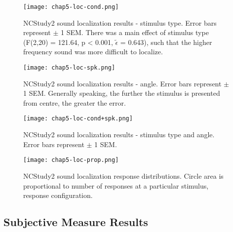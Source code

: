 \begin{figure}[htp]
\begin{center}
\texttt{[image: chap5-loc-cond.png]} \\
\caption[NCStudy2 sound localization results - stimulus type]{NCStudy2 sound localization results - stimulus type.  Error bars represent $\pm$ 1 SEM.  There was a main effect of stimulus type (F(2,20) = 121.64, p < 0.001, $\tilde{\epsilon}$ = 0.643), such that the higher frequency sound was more difficult to localize.}
\label{chap5-loc-cond}
\end{center}
\end{figure}

\begin{figure}[htp]
\begin{center}
\texttt{[image: chap5-loc-spk.png]} \\
\caption[NCStudy2 sound localization results - angle]{NCStudy2 sound localization results - angle.  Error bars represent $\pm$ 1 SEM.  Generally speaking, the further the stimulus is presented from centre, the greater the error.}
\label{chap5-loc-spk}
\end{center}
\end{figure}

\begin{figure}[htp]
\begin{center}
\texttt{[image: chap5-loc-cond+spk.png]} \\
\caption[NCStudy2 sound localization results - stimulus type and angle]{NCStudy2 sound localization results - stimulus type and angle.  Error bars represent $\pm$ 1 SEM.}
\label{chap5-loc-cond-spk}
\end{center}
\end{figure}

\begin{figure}[htp]
\begin{center}
\texttt{[image: chap5-loc-prop.png]} \\
\caption[NCStudy2 sound localization results - response distributions]{NCStudy2 sound localization response distributions.  Circle area is proportional to number of responses at a particular stimulus, response configuration.}
\label{chap5-loc-cond-prop}
\end{center}
\end{figure}

\subsection{Subjective Measure Results}

